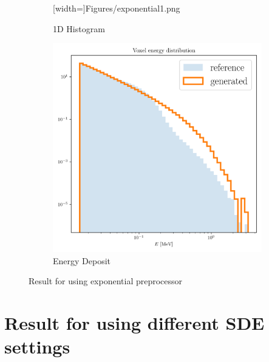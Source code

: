 \begin{figure}
\begin{subfigure}[b]{0.3\textwidth}
        [width=\textwidth]{Figures/exponential1.png}
        \caption{1D Histogram}
        \label{fig:exp1}
    \end{subfigure}
    \hfill
    \begin{subfigure}[b]{0.3\textwidth}
        \centering
        \includegraphics[width=\textwidth]{Figures/exponential6.png}
        \caption{Energy Deposit}
        \label{fig:exp6}
    \end{subfigure}
    \caption{Result for using exponential preprocessor}
\end{figure}

\newpage
\section{Result for using different SDE settings}


